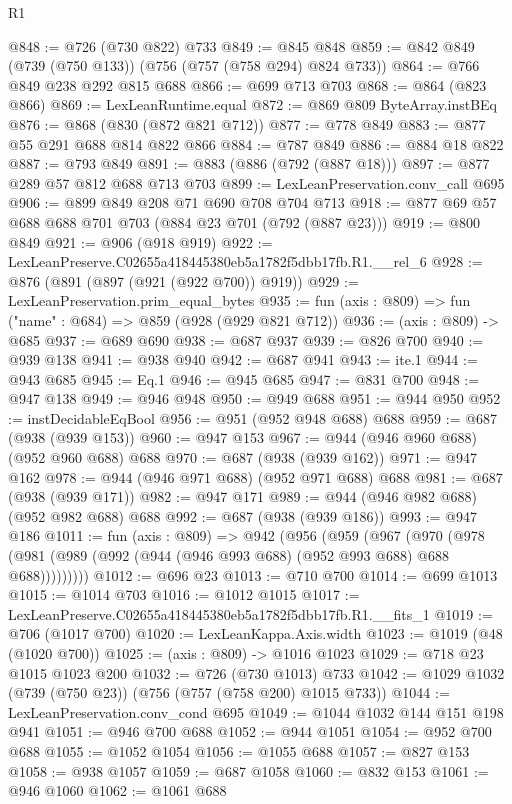 \begin{lexlean}{R1}
\begin{coremodule}
@848 := @726 (@730 @822) @733
@849 := @845 @848
@859 := @842 @849 (@739 (@750 @133)) (@756 (@757 (@758 @294) @824 @733))
@864 := @766 @849 @238 @292 @815 @688
@866 := @699 @713 @703
@868 := @864 (@823 @866)
@869 := LexLeanRuntime.equal
@872 := @869 @809 ByteArray.instBEq
@876 := @868 (@830 (@872 @821 @712))
@877 := @778 @849
@883 := @877 @55 @291 @688 @814 @822 @866
@884 := @787 @849
@886 := @884 @18 @822
@887 := @793 @849
@891 := @883 (@886 (@792 (@887 @18)))
@897 := @877 @289 @57 @812 @688 @713 @703
@899 := LexLeanPreservation.conv_call @695
@906 := @899 @849 @208 @71 @690 @708 @704 @713
@918 := @877 @69 @57 @688 @688 @701 @703 (@884 @23 @701 (@792 (@887 @23)))
@919 := @800 @849
@921 := @906 (@918 @919)
@922 := LexLeanPreserve.C02655a418445380eb5a1782f5dbb17fb.R1.__rel_6
@928 := @876 (@891 (@897 (@921 (@922 @700)) @919))
@929 := LexLeanPreservation.prim_equal_bytes
@935 := fun (axis : @809) => fun ("name" : @684) => @859 (@928 (@929 @821 @712))
@936 := (axis : @809) -> @685
@937 := @689 @690
@938 := @687 @937
@939 := @826 @700
@940 := @939 @138
@941 := @938 @940
@942 := @687 @941
@943 := ite.{1}
@944 := @943 @685
@945 := Eq.{1}
@946 := @945 @685
@947 := @831 @700
@948 := @947 @138
@949 := @946 @948
@950 := @949 @688
@951 := @944 @950
@952 := instDecidableEqBool
@956 := @951 (@952 @948 @688) @688
@959 := @687 (@938 (@939 @153))
@960 := @947 @153
@967 := @944 (@946 @960 @688) (@952 @960 @688) @688
@970 := @687 (@938 (@939 @162))
@971 := @947 @162
@978 := @944 (@946 @971 @688) (@952 @971 @688) @688
@981 := @687 (@938 (@939 @171))
@982 := @947 @171
@989 := @944 (@946 @982 @688) (@952 @982 @688) @688
@992 := @687 (@938 (@939 @186))
@993 := @947 @186
@1011 := fun (axis : @809) =>
  @942
    (@956
      (@959
        (@967
          (@970 (@978 (@981 (@989 (@992 (@944 (@946 @993 @688) (@952 @993 @688) @688 @688)))))))))
@1012 := @696 @23
@1013 := @710 @700
@1014 := @699 @1013
@1015 := @1014 @703
@1016 := @1012 @1015
@1017 := LexLeanPreserve.C02655a418445380eb5a1782f5dbb17fb.R1.__fits_1
@1019 := @706 (@1017 @700)
@1020 := LexLeanKappa.Axis.width
@1023 := @1019 (@48 (@1020 @700))
@1025 := (axis : @809) -> @1016 @1023
@1029 := @718 @23 @1015 @1023 @200
@1032 := @726 (@730 @1013) @733
@1042 := @1029 @1032 (@739 (@750 @23)) (@756 (@757 (@758 @200) @1015 @733))
@1044 := LexLeanPreservation.conv_cond @695
@1049 := @1044 @1032 @144 @151 @198 @941
@1051 := @946 @700 @688
@1052 := @944 @1051
@1054 := @952 @700 @688
@1055 := @1052 @1054
@1056 := @1055 @688
@1057 := @827 @153
@1058 := @938 @1057
@1059 := @687 @1058
@1060 := @832 @153
@1061 := @946 @1060
@1062 := @1061 @688

\end{coremodule}
\end{lexlean}
